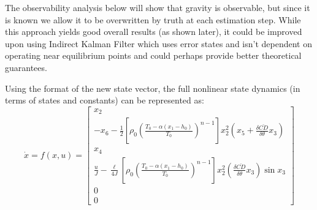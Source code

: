 \documentclass{article}
\begin{document}
  The observability analysis below will show that gravity is observable, but since it is known we allow it to be overwritten by truth at each estimation step. While this approach yields good overall results (as shown later), it could be improved upon using Indirect Kalman Filter which uses error states and isn't dependent on operating near equilibrium points and could perhaps provide better theoretical guarantees.

  Using the format of the new state vector, the full nonlinear state dynamics (in terms of states and constants) can be represented as:
  \begin{equation}
    \dot{x} = f(x,u) = \left[\begin{matrix} x_2 \\
                                            -x_6 -\frac{1}{2} \left[\rho_0 \left(   \frac{T_0 - \alpha\left( x_1-h_0 \right)}{T_0}   \right)^{n-1}\right] x_2^2 \left(x_5 + \frac{\delta\bar{CD}}{\delta\theta} x_3 \right) \\
                                            x_4 \\
                                            \frac{u}{J} - \frac{\ell}{4J} \left[ \rho_0 \left(   \frac{T_0 - \alpha\left( x_1-h_0 \right)}{T_0}   \right)^{n-1} \right] x_2^2 \left(\frac{\delta\bar{CD}}{\delta\theta} x_3 \right) \sin x_3 \\
                                            0 \\
                                            0        \end{matrix}\right]
  \end{equation}
\end{document}
